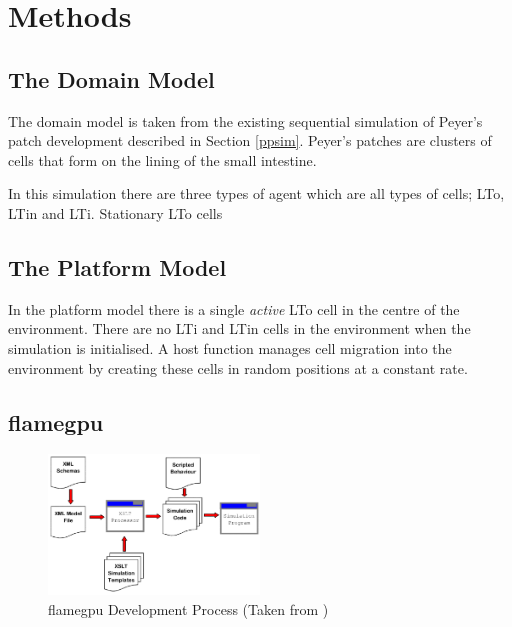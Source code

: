 \documentclass{UoYCSproject}
\begin{document}
\chapter{Methods}
\label{methods}

\section{The Domain Model}
The domain model is taken from the existing sequential simulation of Peyer's patch development described in Section \ref{ppsim}.
Peyer's patches are clusters of cells that form on the lining of the small intestine.

In this simulation there are three types of agent which are all types of cells; LTo, LTin and LTi.
Stationary LTo cells 

\section{The Platform Model}
In the platform model there is a single \textit{active} LTo cell in the centre of the environment.
There are no LTi and LTin cells in the environment when the simulation is initialised.
A host function manages cell migration into the environment by creating these cells in random positions at a constant rate.


\section{\acrshort{flamegpu}}

\begin{figure}
\includegraphics[width=0.5\textwidth]{Appendix/FLAME_Process}
\caption{\acrshort{flamegpu} Development Process (Taken from \cite{flame_simulation})}
\label{fig:flame_dev}
\end{figure}
\end{document}
